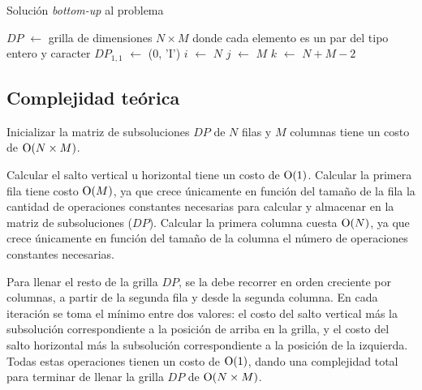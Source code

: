 	\begin{algorithm}[H]
		\caption{Solución \emph{bottom-up} al problema}
		$DP$ $\gets$ grilla de dimensiones $N \times M$ donde cada elemento es
		un par del tipo entero y caracter \;
		$DP_{1,1}$ $\gets$ (0, 'I') \;
		$i$ $\gets$ $N$ \;
		$j$ $\gets$ $M$ \;
		$k$ $\gets$ $N + M - 2$ \;
	\end{algorithm}

    \subsection{Complejidad teórica}
	Inicializar la matriz de subsoluciones $DP$ de $N$ filas y $M$ columnas
	tiene un costo de $\operatorname{O}(N \times M)$.

	Calcular el salto vertical u horizontal tiene un costo de $\operatorname{O}(1)$.
	Calcular la primera fila tiene costo $\operatorname{O}(M)$, ya que crece únicamente en
	función del tamaño de la fila la cantidad de operaciones constantes
	necesarias para calcular y almacenar en la matriz de subsoluciones ($DP$).
	Calcular la primera columna cuesta $\operatorname{O}(N)$, ya que crece únicamente en
	función del tamaño de la columna el número de operaciones constantes
	necesarias.

    Para llenar el resto de la grilla $DP$, se la debe recorrer en orden creciente por columnas, a partir de la segunda fila y desde la segunda columna. En cada iteración se toma el mínimo entre dos valores: el costo del salto vertical más la subsolución correspondiente a la posición de arriba en la grilla, y el costo del salto horizontal más la subsolución correspondiente a la posición de la izquierda. Todas estas operaciones tienen un costo de $\operatorname{O}(1)$, dando una complejidad total para terminar de llenar la grilla $DP$ de $\operatorname{O}(N \times M)$.

